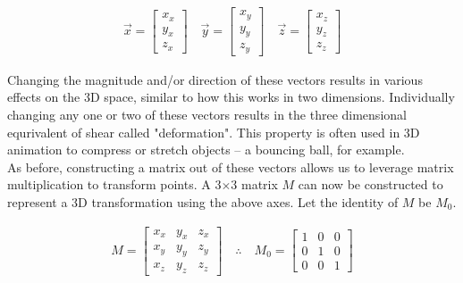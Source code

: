 \documentclass[12pt, a4paper]{article}
\begin{document}
\begin{align*}
    \vec{x} = \begin{bmatrix}
                  {x}_x \\ {y}_x \\ {z}_x
              \end{bmatrix}
    \quad
    \vec{y} = \begin{bmatrix}
                  {x}_y \\ {y}_y \\ {z}_y
              \end{bmatrix}
    \quad
    \vec{z} = \begin{bmatrix}
                  {x}_z \\ {y}_z \\ {z}_z
              \end{bmatrix}
\end{align*}

Changing the magnitude and/or direction of these vectors results in various effects
on the 3D space, similar to how this works in two dimensions. Individually
changing any one or two of these vectors results in the three dimensional
equrivalent of shear called "deformation". This property is often used in 3D
animation to compress or stretch objects -- a bouncing ball, for example. \\

As before, constructing a matrix out of these vectors allows us to leverage
matrix multiplication to transform points. A 3$\times$3 matrix $M$ can now be
constructed to represent a 3D transformation using the above axes. Let the
identity of $M$ be $M_0$.

\begin{align*}
    M = \begin{bmatrix}
            {x}_x & {y}_x & {z}_x \\
            {x}_y & {y}_y & {z}_y \\
            {x}_z & {y}_z & {z}_z
        \end{bmatrix} \quad\therefore\quad M_0 = \begin{bmatrix}
                                                     1 & 0 & 0 \\
                                                     0 & 1 & 0 \\
                                                     0 & 0 & 1
                                                 \end{bmatrix}
\end{align*}
\end{document}
